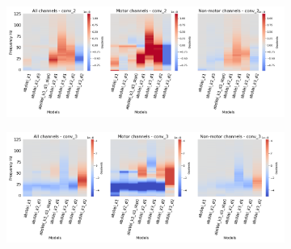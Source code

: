 \begin{figure}[!htb]
\centering
\begin{subfigure}[a]{\textwidth}
   \includegraphics[width=0.9\linewidth]{img/appendix/A/conv-2/m/absVel-model-gradients-all_kinds}
   \caption{}
   \label{fig:absVel-full-grads-conv-2}
\end{subfigure}

\begin{subfigure}[b]{\textwidth}
   \includegraphics[width=0.9\linewidth]{img/appendix/A/conv-3/m/absVel-model-gradients-all_kinds}
   \caption{}
   \label{fig:absVel-full-grads-conv-3}
\end{subfigure}
\end{figure}
\clearpage   

